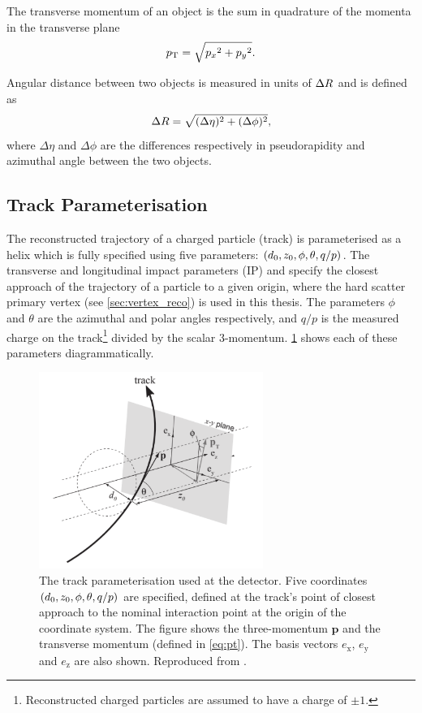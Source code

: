 The transverse momentum \pt of an object is the sum in quadrature of the momenta in the transverse plane
%
\begin{equation}\label{eq:pt}
  p_{\text{T}} = \sqrt{ {p_x}^2 + {p_y}^2 } .
\end{equation}

Angular distance between two objects is measured in units of $\Delta R$ and is defined as
%
\begin{equation}\label{eq:delta_r}
  \Delta R = \sqrt{(\Delta\eta)^{2} + (\Delta\phi)^{2}} ,
\end{equation}
%
where $\Delta \eta$ and $\Delta \phi$ are the differences respectively in pseudorapidity and azimuthal angle between the two objects.


\subsection{Track Parameterisation}\label{sec:track_parameterisation}

The reconstructed trajectory of a charged particle (track) is parameterised as a helix which is fully specified using five parameters: $(d_{0}, z_{0}, \phi, \theta, q/p)$.
The transverse and longitudinal impact parameters (IP) \dzero and \zzero specify the closest approach of the trajectory of a particle to a given origin, where the hard scatter primary vertex (see \cref{sec:vertex_reco}) is used in this thesis.
The parameters $\phi$ and $\theta$ are the azimuthal and polar angles respectively, and $q/p$ is the measured charge on the track\footnote{Reconstructed charged particles are assumed to have a charge of $\pm 1$.} divided by the scalar 3-momentum.
\cref{fig:track_params} shows each of these parameters diagrammatically.

\begin{figure}[p]
  \centering
  \includegraphics[width=0.65\textwidth]{chapters/2.detector/figs/track_params.pdf}
  \caption{
    The track parameterisation used at the \ATLAS detector.
    Five coordinates $(d_{0}, z_{0}, \phi, \theta, q/p)$ are specified, defined at the track's point of closest approach to the nominal interaction point at the origin of the coordinate system.
    The figure shows the three-momentum $\mathbf{p}$ and the transverse momentum \pt (defined in \cref{eq:pt}).
    The basis vectors $e_{\mathrm{x}}$, $e_{\mathrm{y}}$ and $e_{\mathrm{z}}$ are also shown.
    Reproduced from .
  }
  \label{fig:track_params}
\end{figure}

